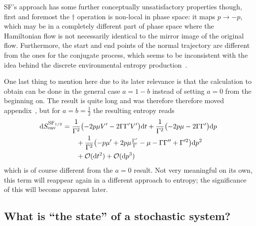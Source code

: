 SF's approach has some further conceptually unsatisfactory properties though, first and foremost the \(\dagger\) operation is non-local in phase space: it maps \(p\to-p\), which may be in a completely different part of phase space where the Hamiltonian flow is not necessarily identical to the mirror image of the original flow. Furthermore, the start and end points of the normal trajectory are different from the ones for the conjugate process, which seems to be inconsistent with the idea behind the discrete environmental entropy production~.

One last thing to mention here due to its later relevance is that the calculation to obtain  can be done in the general case \(a = 1-b\) instead of setting \(a=0\) from the beginning on. The result is quite long and was therefore therefore moved appendix~, but for \(a = b = \frac12\) the resulting entropy reads
%
\begin{equation}\begin{split}
	\label{eqn:sf entropy production 1/2}
	\mathrm{d}S_\text{env}^{\text{SF}_{1/2}} &=
	\frac1{\Gamma^2}\bigl(-2p\mu V'-2\Gamma\Gamma'V'\bigr)\mathrm{d} t
	+ \frac1{\Gamma^2}\bigl(-2p\mu-2\Gamma\Gamma'\bigr)\mathrm{d} p
	\\&\qquad
	+ \frac1{\Gamma^2}\bigl( -p\mu' + 2p\mu \tfrac{\Gamma'}\Gamma - \mu - \Gamma\Gamma'' + \Gamma'^2 \bigr) \mathrm{d} p^2
	\\&\qquad
	+ \mathcal{O}(\mathrm{d} t^2) + \mathcal{O}(\mathrm{d} p^3)
\end{split}\end{equation}
%
which is of course different from the \(a = 0\) result. Not very meaningful on its own, this term will reappear again in a different approach to entropy; the significance of this will become apparent later.




\subsection{What is ``the state'' of a stochastic system?}

